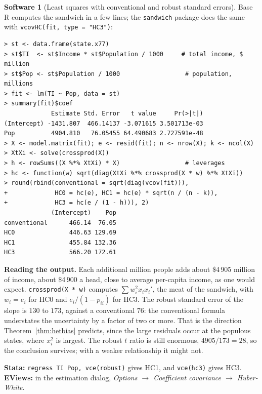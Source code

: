 \documentclass[11pt,a4paper]{article}
\numberwithin{equation}{section}
\theoremstyle{definition}
\newtheorem{software}[thm]{Software}
\begin{document}
\begin{software}[Least squares with conventional and robust standard errors]
\label{sw:robust}
Base R computes the sandwich in a few lines; the \texttt{sandwich} package does the same with \texttt{vcovHC(fit, type = "HC3")}:
{\small\begin{verbatim}
> st <- data.frame(state.x77)
> st$TI  <- st$Income * st$Population / 1000     # total income, $ million
> st$Pop <- st$Population / 1000                  # population, millions
> fit <- lm(TI ~ Pop, data = st)
> summary(fit)$coef
             Estimate Std. Error   t value     Pr(>|t|)
(Intercept) -1431.807  466.14137 -3.071615 3.501713e-03
Pop          4904.810   76.05455 64.490683 2.727591e-48
> X <- model.matrix(fit); e <- resid(fit); n <- nrow(X); k <- ncol(X)
> XtXi <- solve(crossprod(X))
> h <- rowSums((X %*% XtXi) * X)                  # leverages
> hc <- function(w) sqrt(diag(XtXi %*% crossprod(X * w) %*% XtXi))
> round(rbind(conventional = sqrt(diag(vcov(fit))),
+             HC0 = hc(e), HC1 = hc(e) * sqrt(n / (n - k)),
+             HC3 = hc(e / (1 - h))), 2)
             (Intercept)    Pop
conventional      466.14  76.05
HC0               446.63 129.69
HC1               455.84 132.36
HC3               566.20 172.61
\end{verbatim}}
\textbf{Reading the output.} Each additional million people adds about \$4\,905 million of income, about \$4\,900 a head, close to average per-capita
income, as one would expect. \texttt{crossprod(X * w)} computes $\sum w_i^2x_ix_i'$, the meat of the sandwich, with $w_i = e_i$ for HC0 and $e_i/(1 - p_{ii})$ for HC3. The
robust standard error of the slope is $130$ to $173$, against a conventional $76$: the conventional formula understates the uncertainty by a factor of two
or more. That is the direction Theorem~\ref{thm:hetbias} predicts, since the large residuals occur at the populous states, where $x_i^2$ is largest. The
robust $t$ ratio is still enormous, $4905/173 = 28$, so the conclusion survives; with a weaker relationship it might not.

\textbf{Stata:} \texttt{regress TI Pop, vce(robust)} gives HC1, and \texttt{vce(hc3)} gives HC3. \textbf{EViews:} in the estimation dialog,
\emph{Options $\to$ Coefficient covariance $\to$ Huber-White}.
\end{software}
\end{document}
